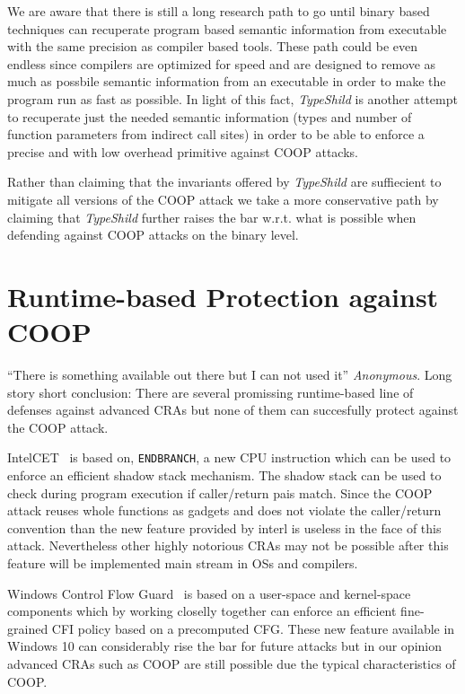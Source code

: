 We are aware that there is still a long research path to go until binary based techniques can 
recuperate program based semantic information from executable with the same precision as compiler based tools.
These path could be even endless since compilers are optimized for speed and are designed to remove as much as possbile semantic information
from an executable in order to make the program run as fast as possible. In light of this fact,
\textit{TypeShild} is another attempt to recuperate just the needed semantic information (types and number of function parameters from
indirect call sites) in order to be able to enforce a precise and with low overhead primitive against COOP attacks.

Rather than claiming that the invariants offered by \textit{TypeShild} are suffiecient
to mitigate all versions of the COOP attack we take a more conservative path by claiming that \textit{TypeShild} 
further raises the bar w.r.t. what is possible when defending against COOP attacks on the binary level.

\section{Runtime-based Protection against COOP}
\label{Runtime-based Protection against COOP}
``There is something available out there but I can not used it'' \textit{Anonymous}.
Long story short conclusion: There are several promissing runtime-based line of defenses against
advanced CRAs but none of them can succesfully protect against the COOP attack.

IntelCET~\cite{intel:cet} is based on, \texttt{ENDBRANCH}, a new CPU instruction which can be used to enforce
an efficient shadow stack mechanism. The shadow stack can be used to check during program execution if caller/return pais match.
Since the COOP attack reuses whole functions as gadgets and does not violate the caller/return convention than the 
new feature provided by interl is useless in the face of this attack. Nevertheless other highly notorious CRAs may not be possible
after this feature will be implemented main stream in OSs and compilers.

Windows Control Flow Guard~\cite{windows:cfguard} is based on a user-space and kernel-space components which
by working closelly together can enforce an efficient fine-grained CFI policy based on a precomputed CFG.
These new feature available in Windows 10 can considerably rise the bar for future attacks but in our opinion advanced CRAs
such as COOP are still possible due the typical characteristics of COOP.

